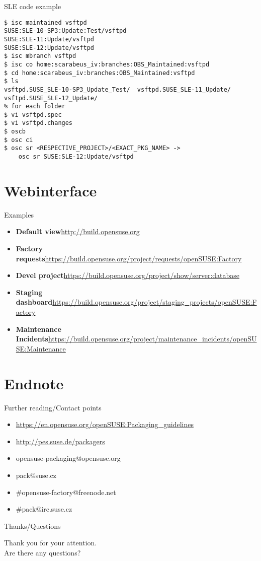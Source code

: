 \documentclass{beamer}
\begin{document}
\begin{frame}[fragile]{SLE code example}
	\begin{tiny}
\begin{verbatim}
$ isc maintained vsftpd
SUSE:SLE-10-SP3:Update:Test/vsftpd
SUSE:SLE-11:Update/vsftpd
SUSE:SLE-12:Update/vsftpd
$ isc mbranch vsftpd
$ isc co home:scarabeus_iv:branches:OBS_Maintained:vsftpd
$ cd home:scarabeus_iv:branches:OBS_Maintained:vsftpd
$ ls
vsftpd.SUSE_SLE-10-SP3_Update_Test/  vsftpd.SUSE_SLE-11_Update/ vsftpd.SUSE_SLE-12_Update/
% for each folder
$ vi vsftpd.spec
$ vi vsftpd.changes
$ oscb
$ osc ci
$ osc sr <RESPECTIVE_PROJECT>/<EXACT_PKG_NAME> ->
	osc sr SUSE:SLE-12:Update/vsftpd
\end{verbatim}
	\end{tiny}
\end{frame}

\section{Webinterface}

\begin{frame}{Examples}
	\begin{itemize}
	\item{\textbf{Default view}\newline \url{http://build.opensuse.org}}
	\item{\textbf{Factory requests}\newline \url{https://build.opensuse.org/project/requests/openSUSE:Factory}}
	\item{\textbf{Devel project}\newline \url{https://build.opensuse.org/project/show/server:database}}
	\item{\textbf{Staging dashboard}\newline \url{https://build.opensuse.org/project/staging\_projects/openSUSE:Factory}}
	\item{\textbf{Maintenance Incidents}\newline \url{https://build.opensuse.org/project/maintenance\_incidents/openSUSE:Maintenance}}
	\end{itemize}
\end{frame}

\section{Endnote}

\begin{frame}[t]{Further reading/Contact points}
	\begin{itemize}
	\item \url{https://en.opensuse.org/openSUSE:Packaging\_guidelines}
	\item \url{http://pes.suse.de/packagers}
	\item opensuse-packaging@opensuse.org
	\item pack@suse.cz
	\item \#opensuse-factory@freenode.net 
	\item \#pack@irc.suse.cz
	\end{itemize}
\end{frame}

\begin{frame}{Thanks/Questions}
	\begin{center}
	Thank you for your attention.\\
	Are there any questions?
	\end{center}
\end{frame}
\end{document}
